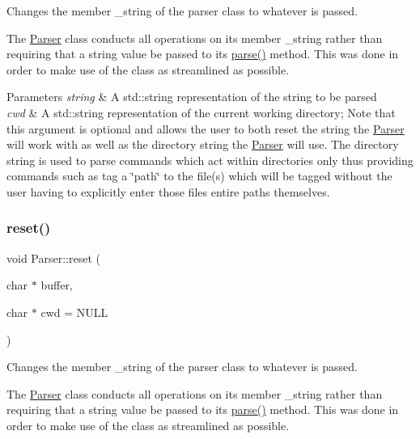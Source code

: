 Changes the member \+\_\+string of the parser class to whatever is passed. 

The \mbox{\hyperlink{classParser}{Parser}} class conducts all operations on its member \+\_\+string rather than requiring that a string value be passed to its \mbox{\hyperlink{classParser_a5b531e9ed867eeb8ccb9cb088cf35c24}{parse()}} method. This was done in order to make use of the class as streamlined as possible.


\begin{DoxyParams}{Parameters}
{\em string} & A std\+::string representation of the string to be parsed\\
\hline
{\em cwd} & A std\+::string representation of the current working directory; Note that this argument is optional and allows the user to both reset the string the \mbox{\hyperlink{classParser}{Parser}} will work with as well as the directory string the \mbox{\hyperlink{classParser}{Parser}} will use. The directory string is used to parse commands which act within directories only thus providing commands such as \textquotesingle{}tag\textquotesingle{} a \char`\"{}path\char`\"{} to the file(s) which will be tagged without the user having to explicitly enter those file\textquotesingle{}s entire paths themselves. \\
\hline
\end{DoxyParams}
\mbox{\label{classParser_a5e097c301e171481e8d2af91c112e35e}} 
\subsubsection{\texorpdfstring{reset()}{reset()}\hspace{0.1cm}{\footnotesize\ttfamily [2/3]}}
{\footnotesize\ttfamily void Parser\+::reset (\begin{DoxyParamCaption}\item[{char $\ast$}]{buffer,  }\item[{char $\ast$}]{cwd = {\ttfamily NULL} }\end{DoxyParamCaption})}



Changes the member \+\_\+string of the parser class to whatever is passed. 

The \mbox{\hyperlink{classParser}{Parser}} class conducts all operations on its member \+\_\+string rather than requiring that a string value be passed to its \mbox{\hyperlink{classParser_a5b531e9ed867eeb8ccb9cb088cf35c24}{parse()}} method. This was done in order to make use of the class as streamlined as possible.


